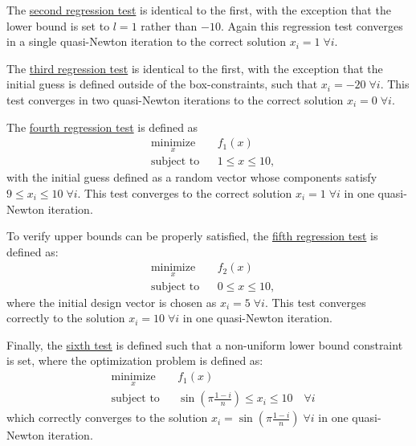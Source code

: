 \documentclass[11pt]{article}
\begin{document}
The
\href{https://github.com/bgranzow/L-BFGS-B/blob/master/test_LBFGSB.m#L24}
{second regression test} is identical to the first,
with the exception that the lower bound is set to $l = 1$
rather than $-10$. Again this regression test converges in a single
quasi-Newton iteration to the correct solution
$x_i = 1 \; \forall i$.

The
\href{https://github.com/bgranzow/L-BFGS-B/blob/master/test_LBFGSB.m#L38}
{third regression test} is identical to the first,
with the exception that the initial guess is defined outside
of the box-constraints, such that $x_i = -20 \; \forall i$.
This test converges in two quasi-Newton iterations to the
correct solution $x_i = 0 \; \forall i$.

The
\href{https://github.com/bgranzow/L-BFGS-B/blob/master/test_LBFGSB.m#L52}
{fourth regression test} is defined as
%
\begin{equation}
\begin{aligned}
& \underset{x}{\text{minimize}}
& & f_1(x) \\
& \text{subject to}
& & 1 \leq x \leq 10,
\end{aligned}
\end{equation}
%
with the initial guess defined as a random
vector whose components satisfy $9 \leq x_i \leq 10 \; \forall i$.
This test converges to the correct solution
$x_i = 1 \; \forall i$ in one quasi-Newton iteration.

To verify upper bounds can be properly satisfied, the
\href{https://github.com/bgranzow/L-BFGS-B/blob/master/test_LBFGSB.m#L66}
{fifth regression test} is defined as:
%
\begin{equation}
\begin{aligned}
& \underset{x}{\text{minimize}}
& & f_2(x) \\
& \text{subject to}
& & 0 \leq x \leq 10,
\end{aligned}
\end{equation}
%
where the initial design vector is chosen as
$x_i = 5 \; \forall i$. This test converges
correctly to the solution $x_i = 10 \; \forall i$
in one quasi-Newton iteration.

Finally, the
\href{https://github.com/bgranzow/L-BFGS-B/blob/master/test_LBFGSB.m#L80}
{sixth test} is defined such that
a non-uniform lower bound constraint is set,
where the optimization problem is defined as:
\begin{equation}
\begin{aligned}
& \underset{x}{\text{minimize}}
& & f_1(x) \\
& \text{subject to}
& & \sin(\pi \frac{1-i}{n}) \leq x_i \leq 10  \quad \forall i
\end{aligned}
\end{equation}
%
which correctly converges to the solution
$x_i = \sin(\pi \frac{1-i}{n}) \; \forall i$ in
one quasi-Newton iteration.
\end{document}
